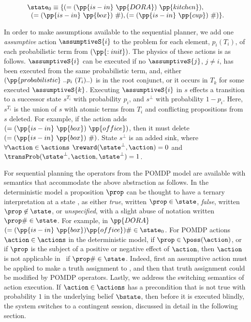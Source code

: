 \[
\begin{array}{l}
\state_0 \equiv \{(=(\pp{is-in}~\pp{DORA})~\pp{kitchen}),\\
\;\;(=(\pp{is-in}~\pp{box})~\#), (=(\pp{is-in}~\pp{cup})~\#)\}.
\end{array}
\]

In order to make assumptions available to the sequential planner, we
add one {\em assumptive} action $\assumptiveS{i}$ to the problem for
each element, $p_i (T_i)$, of each probabilistic term from
$(\pp{:init})$. The physics of these actions is as
follows. $\assumptiveS{i}$ can be executed if no $\assumptiveS{j}$,
$j \neq i$, has been executed from the same probabilistic term, and,
either $(\pp{probabilistic}~..p_i~(T_i)..)$ is in the root conjunct,
or it occurs in $T_k$ for some executed $\assumptiveS{k}$.
Executing $\assumptiveS{i}$ in $s$ effects a transition to a successor
state $s^{T_i}$ with probability $p_i$, and $s^\bot$ with probability
$1 - p_i$. Here, $s^{T_i}$ is the union of $s$ with atomic terms from
$T_i$ and conflicting propositions from $s$ deleted. For example, if
the action adds $(=(\pp{is-in}~\pp{box})~\pp{office})$, then it must
delete $(=(\pp{is-in}~\pp{box})~\#)$. State $s^\bot$ is an added sink,
where $\forall\action\in\actions$ $\reward(\state^\bot, \action) = 0$
and $\transProb(\state^\bot, \action, \state^\bot) = 1$.

For sequential planning the operators from the POMDP model are
available with semantics that accommodate the above abstraction as
follows. In the deterministic model a proposition $\prop$ can be
thought to have a ternary interpretation at a state \state, as either
{\em true}, written $\prop\in\state$, {\em false}, written
$\prop\not\in\state$, or {\em unspecified}, with a slight abuse of
notation written $\prop\#\in\state$. For example, in $\pp{DORA}$
$(=(\pp{is-in}~\pp{box})\pp{office})\#\in\state_0$. For POMDP actions
$\action\in\actions$ in the deterministic model, if
$\prop \in \poss(\action)$, or if $\prop$ is the subject of a positive
or negative effect of $\action$, then $\action$ is not applicable
in \state\ if $\prop\#\in\state$. Indeed, first an assumptive action
must be applied to make a truth assignment to \prop, and then that
truth assignment could be modified by POMDP operators. Lastly, we
address the switching semantics of action execution. If
$\action\in\actions$ has a precondition that is not true with
probability $1$ in the underlying belief $\bstate$, then before it is
executed blindly, the system switches to a contingent session,
discussed in detail in the following section.


